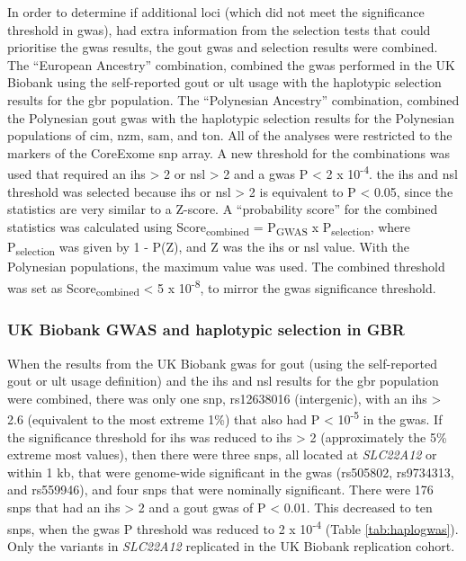 \documentclass[]{report}
\begin{document}
In order to determine if additional loci (which did not meet the
significance threshold in \gls{gwas}), had extra information from the
selection tests that could prioritise the \gls{gwas} results, the gout
\gls{gwas} and selection results were combined. The ``European
Ancestry'' combination, combined the \gls{gwas} performed in the UK
Biobank using the self-reported gout or \gls{ult} usage with the
haplotypic selection results for the \gls{gbr} population. The
``Polynesian Ancestry'' combination, combined the Polynesian gout
\gls{gwas} with the haplotypic selection results for the Polynesian
populations of \gls{cim}, \gls{nzm}, \gls{sam}, and \gls{ton}. All of
the analyses were restricted to the markers of the CoreExome \gls{snp}
array. A new threshold for the combinations was used that required an
\textbar{}\gls{ihs}\textbar{} \textgreater{} 2 or
\textbar{}\gls{nsl}\textbar{} \textgreater{} 2 and a \gls{gwas} P
\textless{} 2 x 10\textsuperscript{-4}. the \gls{ihs} and \gls{nsl}
threshold was selected because \textbar{}\gls{ihs}\textbar{} or
\textbar{}\gls{nsl}\textbar{} \textgreater{} 2 is equivalent to P
\textless{} 0.05, since the statistics are very similar to a Z-score. A
``probability score'' for the combined statistics was calculated using
Score\textsubscript{combined} = P\textsubscript{GWAS} x
P\textsubscript{selection}, where P\textsubscript{selection} was given
by 1 - P(\textbar{}Z\textbar{}), and Z was the \gls{ihs} or \gls{nsl}
value. With the Polynesian populations, the maximum
\textbar{}value\textbar{} was used. The combined threshold was set as
Score\textsubscript{combined} \textless{} 5 x 10\textsuperscript{-8}, to
mirror the \gls{gwas} significance threshold.

\subsubsection{UK Biobank GWAS and haplotypic selection in
GBR}\label{uk-biobank-gwas-and-haplotypic-selection-in-gbr}

When the results from the UK Biobank \gls{gwas} for gout (using the
self-reported gout or \gls{ult} usage definition) and the \gls{ihs} and
\gls{nsl} results for the \gls{gbr} population were combined, there was
only one \gls{snp}, rs12638016 (intergenic), with an
\textbar{}\gls{ihs}\textbar{} \textgreater{} 2.6 (equivalent to the most
extreme 1\%) that also had P \textless{} 10\textsuperscript{-5} in the
\gls{gwas}. If the significance threshold for \gls{ihs} was reduced to
\textbar{}\gls{ihs}\textbar{} \textgreater{} 2 (approximately the 5\%
extreme most values), then there were three \glspl{snp}, all located at
\emph{SLC22A12} or within 1 kb, that were genome-wide significant in the
\gls{gwas} (rs505802, rs9734313, and rs559946), and four \glspl{snp}
that were nominally significant. There were 176 \glspl{snp} that had an
\textbar{}\gls{ihs}\textbar{} \textgreater{} 2 and a gout \gls{gwas} of
P \textless{} 0.01. This decreased to ten \glspl{snp}, when the
\gls{gwas} P threshold was reduced to 2 x 10\textsuperscript{-4} (Table
\ref{tab:haplogwas}). Only the variants in \emph{SLC22A12} replicated in
the UK Biobank replication cohort.
\end{document}
